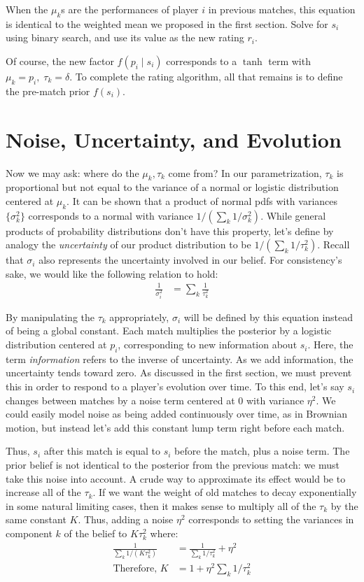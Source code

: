 \documentclass{article}
\begin{document}
When the $\mu_k$s are the performances of player $i$ in previous matches, this equation is identical to the weighted mean we proposed in the first section. Solve for $s_i$ using binary search, and use its value as the new rating $r_i$.

Of course, the new factor $f(p_i \mid s_i)$ corresponds to a $\tanh$ term with $\mu_k = p_i,\;\tau_k=\delta$. To complete the rating algorithm, all that remains is to define the pre-match prior $f(s_i)$.

\section{Noise, Uncertainty, and Evolution}

Now we may ask: where do the $\mu_k,\tau_k$ come from? In our parametrization, $\tau_k$ is proportional but not equal to the variance of a normal or logistic distribution centered at $\mu_k$. It can be shown that a product of normal pdfs with variances $\{\sigma_k^2\}$ corresponds to a normal with variance $1/(\sum_k 1/\sigma_k^2)$. While general products of probability distributions don't have this property, let's define by analogy the \emph{uncertainty} of our product distribution to be $1/(\sum_k 1/\tau_k^2)$. Recall that $\sigma_i$ also represents the uncertainty involved in our belief. For consistency's sake, we would like the following relation to hold:
\begin{align}
\frac{1}{\sigma_i^2} &= \sum_k \frac{1}{\tau_k^2}
\end{align}

By manipulating the $\tau_k$ appropriately, $\sigma_i$ will be defined by this equation instead of being a global constant. Each match multiplies the posterior by a logistic distribution centered at $p_i$, corresponding to new information about $s_i$. Here, the term \emph{information} refers to the inverse of uncertainty. As we add information, the uncertainty tends toward zero. As discussed in the first section, we must prevent this in order to respond to a player's evolution over time. To this end, let's say $s_i$ changes between matches by a noise term centered at $0$ with variance $\eta^2$. We could easily model noise as being added continuously over time, as in Brownian motion, but instead let's add this constant lump term right before each match.

Thus, $s_i$ after this match is equal to $s_i$ before the match, plus a noise term. The prior belief is not identical to the posterior from the previous match: we must take this noise into account. A crude way to approximate its effect would be to increase all of the $\tau_k$. If we want the weight of old matches to decay exponentially in some natural limiting cases, then it makes sense to multiply all of the $\tau_k$ by the same constant $K$. Thus, adding a noise $\eta^2$ corresponds to setting the variances in component $k$ of the belief to $K\tau_k^2$ where:
\begin{align}
\frac{1}{\sum_k 1/(K\tau_k^2)} &= \frac{1}{\sum_k 1/\tau_k^2} + \eta^2
\\ \text{Therefore, }K &= 1 + \eta^2\sum_k 1/\tau_k^2
\end{align}
\end{document}
